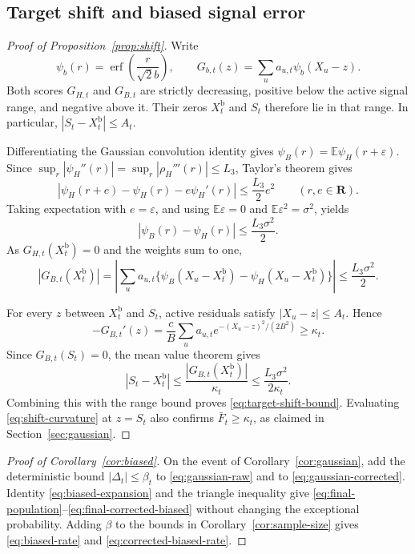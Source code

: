 \documentclass[11pt]{article}
\newcommand{\E}{\mathbb{E}}
\newcommand{\R}{\mathbf{R}}
\newcommand{\BiasedSignal}{X^{\mathrm b}}
\theoremstyle{definition}
\begin{document}
\subsection{Target shift and biased signal error}

\begin{proof}[Proof of Proposition~\ref{prop:shift}]
Write
\[
  \psi_b(r)=\operatorname{erf}\!\left(\frac{r}{\sqrt2b}\right),
  \qquad G_{b,t}(z)=\sum_u a_{u,t}\psi_b(X_u-z).
\]
Both scores \(G_{H,t}\) and \(G_{B,t}\) are strictly decreasing, positive
below the active signal range, and negative above it.  Their zeros
\(\BiasedSignal_t\) and \(S_t\) therefore lie in that range.  In particular,
\(|S_t-\BiasedSignal_t|\leq A_t\).

Differentiating the Gaussian convolution identity gives
\(\psi_B(r)=\E\psi_H(r+\varepsilon)\).  Since
\(\sup_r|\psi_H''(r)|=\sup_r|\rho_H'''(r)|\leq L_3\), Taylor's theorem gives
\[
  |\psi_H(r+e)-\psi_H(r)-e\psi_H'(r)|\leq\frac{L_3}{2}e^2
  \qquad(r,e\in\R).
\]
Taking expectation with \(e=\varepsilon\), and using
\(\E\varepsilon=0\) and \(\E\varepsilon^2=\sigma^2\), yields
\[
  |\psi_B(r)-\psi_H(r)|\leq\frac{L_3\sigma^2}{2}.
\]
As \(G_{H,t}(\BiasedSignal_t)=0\) and the weights sum to one,
\begin{equation}
  |G_{B,t}(\BiasedSignal_t)|
    =\left|\sum_u a_{u,t}
      \{\psi_B(X_u-\BiasedSignal_t)-\psi_H(X_u-\BiasedSignal_t)\}\right|
    \leq\frac{L_3\sigma^2}{2}.
  \label{eq:shift-score}
\end{equation}

For every \(z\) between \(\BiasedSignal_t\) and \(S_t\), active residuals satisfy
\(|X_u-z|\leq A_t\).  Hence
\begin{equation}
  -G_{B,t}'(z)=\frac cB\sum_u a_{u,t}e^{-(X_u-z)^2/(2B^2)}
             \geq\kappa_t.
  \label{eq:shift-curvature}
\end{equation}
Since \(G_{B,t}(S_t)=0\), the mean value theorem gives
\[
  |S_t-\BiasedSignal_t|\leq\frac{|G_{B,t}(\BiasedSignal_t)|}{\kappa_t}
            \leq\frac{L_3\sigma^2}{2\kappa_t}.
\]
Combining this with the range bound proves \eqref{eq:target-shift-bound}.
Evaluating \eqref{eq:shift-curvature} at \(z=S_t\) also confirms
\(\bar F_t\geq\kappa_t\), as claimed in Section~\ref{sec:gaussian}.
\end{proof}

\begin{proof}[Proof of Corollary~\ref{cor:biased}]
On the event of Corollary~\ref{cor:gaussian}, add the deterministic bound
\(|\Delta_t|\leq\beta_t\) to \eqref{eq:gaussian-raw} and to
\eqref{eq:gaussian-corrected}.  Identity \eqref{eq:biased-expansion} and the
triangle inequality give
\eqref{eq:final-population}--\eqref{eq:final-corrected-biased} without
changing the exceptional probability.  Adding \(\beta\) to the bounds in
Corollary~\ref{cor:sample-size} gives \eqref{eq:biased-rate} and
\eqref{eq:corrected-biased-rate}.
\end{proof}
\end{document}
